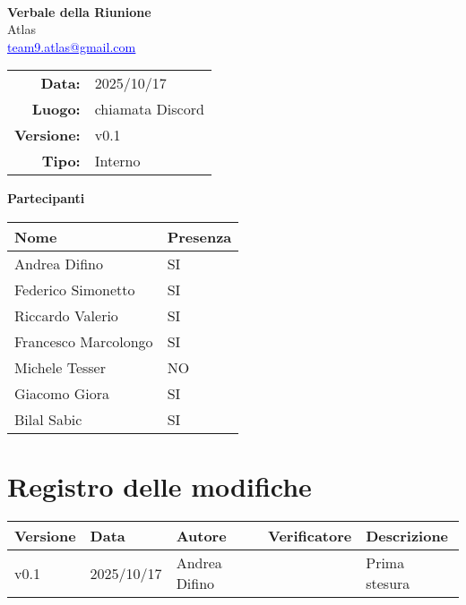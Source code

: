 \documentclass[a4paper,12pt]{article}
\makeatletter
\newcommand{\Gruppo}{Atlas}
\newcommand{\Email}{\href{mailto:team9.atlas@gmail.com}{\textcolor{blue}{\underline{team9.atlas@gmail.com}}}}
\newcommand{\TitoloVerbale}{Verbale della Riunione}
\newcommand{\DataVerbale}{2025/10/17}
\newcommand{\LuogoVerbale}{chiamata Discord}
\newcommand{\LogoGruppo}{img/AtlasLogo.png} %
\newcommand{\VersioneVerbale}{v0.1} %
\newcommand{\VerbaleInterno}{Interno}
\makeatother
\begin{document}
\begin{titlepage}
    \centering

    \vspace*{0cm}
    \\
    [.5cm]
    {\Huge \textbf{\TitoloVerbale}}\\[0.8cm]
    {\LARGE \Gruppo}\\[0.1cm]
    {\Email}\\[1.2cm]

    \begin{tabular}{rl}
        \textbf{Data:} & \DataVerbale \\
        \textbf{Luogo:} & \LuogoVerbale \\
        \textbf{Versione:} & \VersioneVerbale \\
        \textbf{Tipo:} & \VerbaleInterno \\
    \end{tabular}

    \vspace{1.2cm}

    {\large \textbf{Partecipanti}}\\[0.5cm]
    \begin{tabular}{l|l}
        \textbf{Nome} & \textbf{Presenza} \\
        \hline
        Andrea Difino & SI \\
        Federico Simonetto & SI \\
        Riccardo Valerio & SI \\
        Francesco Marcolongo & SI \\
        Michele Tesser & NO \\
        Giacomo Giora & SI \\
        Bilal Sabic & SI \\
    \end{tabular}

\end{titlepage}

\section*{Registro delle modifiche}{
    \begin{center} 
        \begin{tabular}{|l|l|l|l|l|}
            \hline
            \textbf{Versione} & \textbf{Data} & \textbf{Autore} & \textbf{Verificatore} & \textbf{Descrizione} \\
            \hline
            \VersioneVerbale & \DataVerbale & Andrea Difino & & Prima stesura\\
            \hline
        \end{tabular}
    \end{center}
}
\end{document}
